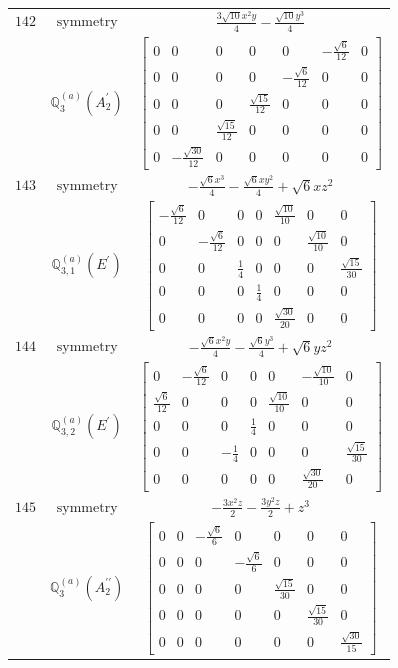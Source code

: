 \documentclass[fleqn,8pt,landscape]{jsarticle}
\begin{document}
\begin{longtable}{ccc}
$ 142 $ & $ \text{symmetry} $ & $ \frac{3 \sqrt{10} x^{2} y}{4} - \frac{\sqrt{10} y^{3}}{4} $ \\
$  $ & $ \mathbb{Q}_{3}^{(a)}(A_{2}^{\prime}) $ & $ \begin{bmatrix} 0 & 0 & 0 & 0 & 0 & - \frac{\sqrt{6}}{12} & 0 \\ 0 & 0 & 0 & 0 & - \frac{\sqrt{6}}{12} & 0 & 0 \\ 0 & 0 & 0 & \frac{\sqrt{15}}{12} & 0 & 0 & 0 \\ 0 & 0 & \frac{\sqrt{15}}{12} & 0 & 0 & 0 & 0 \\ 0 & - \frac{\sqrt{30}}{12} & 0 & 0 & 0 & 0 & 0 \end{bmatrix} $ \\ \hline
$ 143 $ & $ \text{symmetry} $ & $ - \frac{\sqrt{6} x^{3}}{4} - \frac{\sqrt{6} x y^{2}}{4} + \sqrt{6} x z^{2} $ \\
$  $ & $ \mathbb{Q}_{3,1}^{(a)}(E^{\prime}) $ & $ \begin{bmatrix} - \frac{\sqrt{6}}{12} & 0 & 0 & 0 & \frac{\sqrt{10}}{10} & 0 & 0 \\ 0 & - \frac{\sqrt{6}}{12} & 0 & 0 & 0 & \frac{\sqrt{10}}{10} & 0 \\ 0 & 0 & \frac{1}{4} & 0 & 0 & 0 & \frac{\sqrt{15}}{30} \\ 0 & 0 & 0 & \frac{1}{4} & 0 & 0 & 0 \\ 0 & 0 & 0 & 0 & \frac{\sqrt{30}}{20} & 0 & 0 \end{bmatrix} $ \\ \hline
$ 144 $ & $ \text{symmetry} $ & $ - \frac{\sqrt{6} x^{2} y}{4} - \frac{\sqrt{6} y^{3}}{4} + \sqrt{6} y z^{2} $ \\
$  $ & $ \mathbb{Q}_{3,2}^{(a)}(E^{\prime}) $ & $ \begin{bmatrix} 0 & - \frac{\sqrt{6}}{12} & 0 & 0 & 0 & - \frac{\sqrt{10}}{10} & 0 \\ \frac{\sqrt{6}}{12} & 0 & 0 & 0 & \frac{\sqrt{10}}{10} & 0 & 0 \\ 0 & 0 & 0 & \frac{1}{4} & 0 & 0 & 0 \\ 0 & 0 & - \frac{1}{4} & 0 & 0 & 0 & \frac{\sqrt{15}}{30} \\ 0 & 0 & 0 & 0 & 0 & \frac{\sqrt{30}}{20} & 0 \end{bmatrix} $ \\ \hline
$ 145 $ & $ \text{symmetry} $ & $ - \frac{3 x^{2} z}{2} - \frac{3 y^{2} z}{2} + z^{3} $ \\
$  $ & $ \mathbb{Q}_{3}^{(a)}(A_{2}^{\prime\prime}) $ & $ \begin{bmatrix} 0 & 0 & - \frac{\sqrt{6}}{6} & 0 & 0 & 0 & 0 \\ 0 & 0 & 0 & - \frac{\sqrt{6}}{6} & 0 & 0 & 0 \\ 0 & 0 & 0 & 0 & \frac{\sqrt{15}}{30} & 0 & 0 \\ 0 & 0 & 0 & 0 & 0 & \frac{\sqrt{15}}{30} & 0 \\ 0 & 0 & 0 & 0 & 0 & 0 & \frac{\sqrt{30}}{15} \end{bmatrix} $ \\ \hline

\end{longtable}
\end{document}
